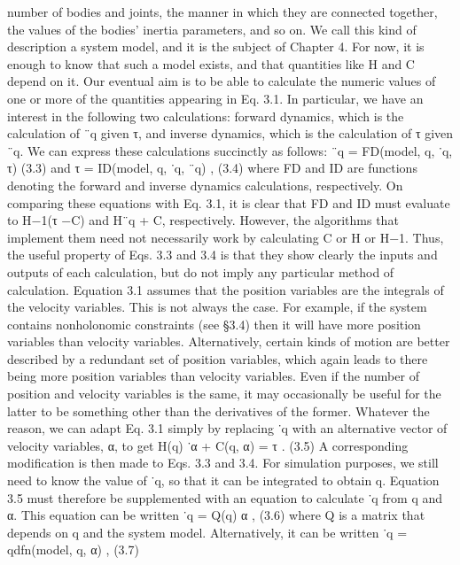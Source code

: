 number of bodies and joints, the manner in which they are connected together, the values of the bodies’ inertia parameters, and so on. We call this kind of description a system model, and it is the subject of Chapter 4. For now, it is enough to know that such a model exists, and that quantities like H and C depend on it. Our eventual aim is to be able to calculate the numeric values of one or more of the quantities appearing in Eq. 3.1. In particular, we have an interest in the following two calculations: forward dynamics, which is the calculation of ¨q given τ, and inverse dynamics, which is the calculation of τ given ¨q. We can express these calculations succinctly as follows: ¨q = FD(model, q, ˙q, τ) (3.3) and τ = ID(model, q, ˙q, ¨q) , (3.4) where FD and ID are functions denoting the forward and inverse dynamics calculations, respectively. On comparing these equations with Eq. 3.1, it is clear that FD and ID must evaluate to H−1(τ −C) and H¨q + C, respectively. However, the algorithms that implement them need not necessarily work by calculating C or H or H−1. Thus, the useful property of Eqs. 3.3 and 3.4 is that they show clearly the inputs and outputs of each calculation, but do not imply any particular method of calculation. Equation 3.1 assumes that the position variables are the integrals of the velocity variables. This is not always the case. For example, if the system contains nonholonomic constraints (see §3.4) then it will have more position variables than velocity variables. Alternatively, certain kinds of motion are better described by a redundant set of position variables, which again leads to there being more position variables than velocity variables. Even if the number of position and velocity variables is the same, it may occasionally be useful for the latter to be something other than the derivatives of the former. Whatever the reason, we can adapt Eq. 3.1 simply by replacing ˙q with an alternative vector of velocity variables, α, to get H(q) ˙α + C(q, α) = τ . (3.5) A corresponding modification is then made to Eqs. 3.3 and 3.4. For simulation purposes, we still need to know the value of ˙q, so that it can be integrated to obtain q. Equation 3.5 must therefore be supplemented with an equation to calculate ˙q from q and α. This equation can be written ˙q = Q(q) α , (3.6) where Q is a matrix that depends on q and the system model. Alternatively, it can be written ˙q = qdfn(model, q, α) , (3.7)


